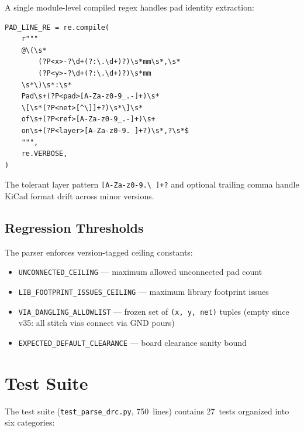 \documentclass[11pt,a4paper]{article}
\begin{document}
A single module-level compiled regex handles pad identity extraction:

\begin{lstlisting}[caption={\texttt{PAD\_LINE\_RE} --- single source of truth (line 40).},label={lst:pad-re}]
PAD_LINE_RE = re.compile(
    r"""
    @\(\s*
        (?P<x>-?\d+(?:\.\d+)?)\s*mm\s*,\s*
        (?P<y>-?\d+(?:\.\d+)?)\s*mm
    \s*\)\s*:\s*
    Pad\s+(?P<pad>[A-Za-z0-9_.-]+)\s*
    \[\s*(?P<net>[^\]]+?)\s*\]\s*
    of\s+(?P<ref>[A-Za-z0-9_.-]+)\s+
    on\s+(?P<layer>[A-Za-z0-9. ]+?)\s*,?\s*$
    """,
    re.VERBOSE,
)
\end{lstlisting}

The tolerant layer pattern \texttt{[A-Za-z0-9.\textbackslash{} ]+?} and optional
trailing comma handle KiCad format drift across minor versions.

\subsection{Regression Thresholds}

The parser enforces version-tagged ceiling constants:

\begin{itemize}
    \item \texttt{UNCONNECTED\_CEILING} --- maximum allowed unconnected pad count
    \item \texttt{LIB\_FOOTPRINT\_ISSUES\_CEILING} --- maximum library footprint issues
    \item \texttt{VIA\_DANGLING\_ALLOWLIST} --- frozen set of \texttt{(x, y, net)} tuples
          (empty since v35: all stitch vias connect via GND pours)
    \item \texttt{EXPECTED\_DEFAULT\_CLEARANCE} --- board clearance sanity bound
\end{itemize}

\section{Test Suite}
\label{sec:tests}

The test suite (\texttt{test\_parse\_drc.py}, 750~lines) contains 27~tests
organized into six categories:
\end{document}
